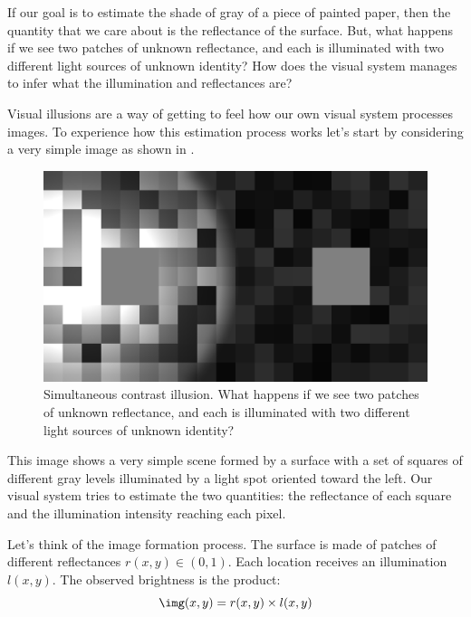 If our goal is to estimate the shade of gray of a piece of painted paper, then the quantity that we care about is the reflectance of the surface. But, what happens if we see two patches of unknown reflectance, and each is illuminated with two different light sources of unknown identity?  How does the visual system manages to infer what the illumination and reflectances are?

%
%



Visual illusions are a way of getting to feel how our own visual system processes images. To experience how this estimation process works let's start by considering a very simple image as shown in \fig{\ref{fig:simultaneous}}. 

\begin{figure}[t]
\centerline{
\includegraphics[width=1\linewidth]{figures/statistical_image_models/retinex.jpg}
} 
\caption{Simultaneous contrast illusion. What happens if we see two patches of unknown reflectance, and each is illuminated with two different light sources of unknown identity?} 
\label{fig:simultaneous}
\end{figure}


This image shows a very simple scene formed by a surface with a set of squares of different gray levels illuminated by a light spot oriented toward the left. Our visual system tries to estimate the two quantities: the reflectance of each square and the illumination intensity reaching each pixel.  

Let's think of the image formation process. The surface is made of patches of different reflectances $r(x,y) \in (0,1)$. Each location receives an illumination $l(x,y)$. The observed brightness is the product:
\begin{equation}
\img (x,y) = r(x,y) \times l(x,y) 
\end{equation}

